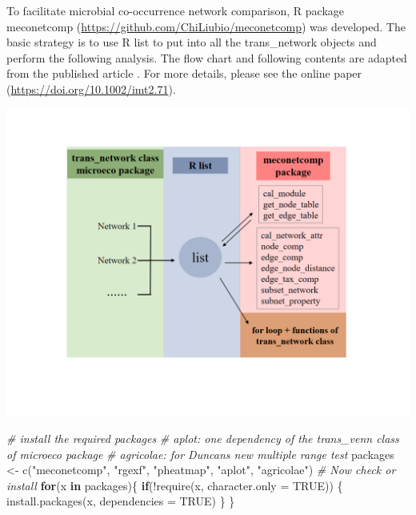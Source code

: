 \documentclass[
]{book}
\newenvironment{Shaded}{\begin{snugshade}}{\end{snugshade}}
\newcommand{\AttributeTok}[1]{\textcolor[rgb]{0.77,0.63,0.00}{#1}}
\newcommand{\CommentTok}[1]{\textcolor[rgb]{0.56,0.35,0.01}{\textit{#1}}}
\newcommand{\ConstantTok}[1]{\textcolor[rgb]{0.00,0.00,0.00}{#1}}
\newcommand{\ControlFlowTok}[1]{\textcolor[rgb]{0.13,0.29,0.53}{\textbf{#1}}}
\newcommand{\FunctionTok}[1]{\textcolor[rgb]{0.00,0.00,0.00}{#1}}
\newcommand{\NormalTok}[1]{#1}
\newcommand{\OtherTok}[1]{\textcolor[rgb]{0.56,0.35,0.01}{#1}}
\newcommand{\SpecialCharTok}[1]{\textcolor[rgb]{0.00,0.00,0.00}{#1}}
\newcommand{\StringTok}[1]{\textcolor[rgb]{0.31,0.60,0.02}{#1}}
\begin{document}
To facilitate microbial co-occurrence network comparison,
R package meconetcomp (\url{https://github.com/ChiLiubio/meconetcomp}) was developed.
The basic strategy is to use R list to put into all the trans\_network objects and perform the following analysis.
The flow chart and following contents are adapted from the published article \citep{Liu_meconetcomp_2023}.
For more details, please see the online paper (\url{https://doi.org/10.1002/imt2.71}).

\begin{center}\includegraphics[width=650px]{Images/meconetcomp} \end{center}

\begin{Shaded}
\begin{Highlighting}[]
\CommentTok{\# install the required packages}
\CommentTok{\# aplot: one dependency of the trans\_venn class of microeco package}
\CommentTok{\# agricolae: for Duncan\textquotesingle{}s new multiple range test}
\NormalTok{packages }\OtherTok{\textless{}{-}} \FunctionTok{c}\NormalTok{(}\StringTok{"meconetcomp"}\NormalTok{, }\StringTok{"rgexf"}\NormalTok{, }\StringTok{"pheatmap"}\NormalTok{, }\StringTok{"aplot"}\NormalTok{, }\StringTok{"agricolae"}\NormalTok{)}
\CommentTok{\# Now check or install}
\ControlFlowTok{for}\NormalTok{(x }\ControlFlowTok{in}\NormalTok{ packages)\{}
    \ControlFlowTok{if}\NormalTok{(}\SpecialCharTok{!}\FunctionTok{require}\NormalTok{(x, }\AttributeTok{character.only =} \ConstantTok{TRUE}\NormalTok{)) \{}
        \FunctionTok{install.packages}\NormalTok{(x, }\AttributeTok{dependencies =} \ConstantTok{TRUE}\NormalTok{)}
\NormalTok{    \}}
\NormalTok{\}}
\end{Highlighting}
\end{Shaded}
\end{document}
